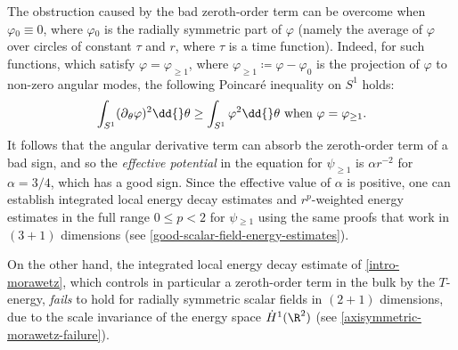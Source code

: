 \documentclass[10pt, reqno]{amsart}
\begin{document}
The obstruction caused by the bad zeroth-order term can be overcome when
\(\varphi{}_0\equiv 0\), where \(\varphi{}_0\) is the radially symmetric part of
\(\varphi{}\) (namely the average of \(\varphi{}\) over circles of constant
\(\tau{}\) and \(r\), where \(\tau{}\) is a time function). Indeed, for such
functions, which satisfy \(\varphi{} = \varphi_{\ge 1}\), where \(\varphi_{\ge
1} \coloneqq{} \varphi{} - \varphi_0\) is the projection of \(\varphi{}\) to
non-zero angular modes, the following Poincaré inequality on \(S^1\) holds:
\begin{equation}
\int _{S^1} (\partial{}_\theta{}\varphi{})^2\dd{}\theta{}\ge \int _{S^1} \varphi{}^2\dd{}\theta{}\textnormal{ when }\varphi{}=\varphi{}_{\ge 1}.
\end{equation}
It follows that the angular derivative term can absorb the zeroth-order term of
a bad sign, and so the \emph{effective potential} in the equation for \(\psi_{\ge 1}\)
is \(\alpha{}r^{-2}\) for \(\alpha{} = 3/4\), which has a good sign. Since the
effective value of \(\alpha{}\) is positive, one can establish integrated local
energy decay estimates and \(r^p\)-weighted energy estimates in the full range
\(0\le p < 2\) for \(\psi{}_{\ge 1}\) using the same proofs that work in
\((3+1)\) dimensions (see \cref{good-scalar-field-energy-estimates}).

On the other hand, the integrated local energy decay estimate of
\cref{intro-morawetz}, which controls in particular a zeroth-order term in the bulk
by the \(T\)-energy, \emph{fails} to hold for radially symmetric scalar fields in \((2 + 1)\)
dimensions, due to the scale invariance of the energy space \(\dot{H}^1(\R^2)\)
(see \cref{axisymmetric-morawetz-failure}).
\end{document}

